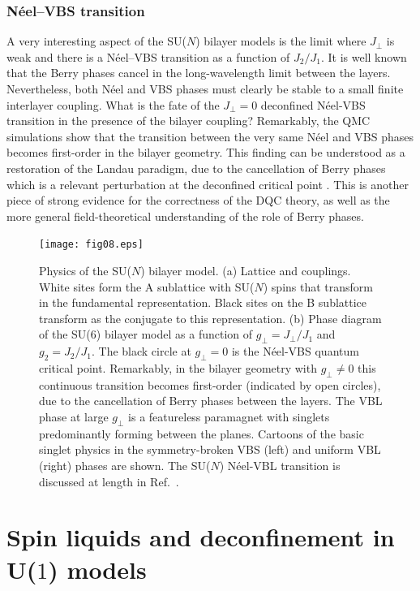 \documentclass[10pt,pre,aps,twocolumn,showpacs,subscriptaddresses,floatfix]{revtex4}
\begin{document}
\subsubsection{N\'eel--VBS transition}
A very interesting aspect of the SU($N$) bilayer models is the limit where $J_\perp$ is weak and there is a N\'eel--VBS transition as a function of $J_2/J_1$.
It is well known that the Berry phases cancel in the long-wavelength limit between the layers. Nevertheless, both N\'eel and VBS phases must clearly be stable 
to a small finite interlayer coupling. What is the fate of the $J_\perp=0$ deconfined N\'eel-VBS transition in the presence of the bilayer coupling? Remarkably, 
the QMC simulations show that the transition between the very same N\'eel and VBS phases becomes first-order in the bilayer geometry. This finding can be 
understood as a restoration of the Landau paradigm, due to the cancellation of Berry phases which is a relevant perturbation at the deconfined critical 
point \cite{kaul2012:sun_bil}. This is another piece of strong evidence for the correctness of the DQC theory, as well as the more general field-theoretical 
understanding of the role of Berry phases.

\begin{figure}
\texttt{[image: fig08.eps]}
  \caption{ \label{fig:pd_bil}  Physics of the SU($N$) bilayer model.  (a) Lattice and couplings. White sites form the A sublattice with 
  SU($N$) spins that transform in the fundamental representation. Black sites on the B sublattice transform as the conjugate to this representation. (b) Phase diagram of the
  SU($6$) bilayer model as a function of $g_\perp =J_\perp/J_1$ and $g_2=J_2/J_1$. The black circle at $g_\perp=0$ is the N\'eel-VBS quantum critical point. Remarkably, 
  in the bilayer geometry with $g_\perp\neq 0$ this continuous transition becomes first-order (indicated by open circles), due to the cancellation of Berry phases between 
  the layers. The VBL phase at large $g_\perp$ is a featureless paramagnet with singlets predominantly forming between the planes. Cartoons of the basic singlet physics 
  in the symmetry-broken VBS (left) and uniform VBL (right) phases are shown. The SU($N$) N\'eel-VBL transition is discussed at length in Ref.~\cite{kaul2012:sun_bil}.}
\end{figure}

\section{Spin liquids and deconfinement in U($1$) models}
\label{sec:u1models}
\end{document}
